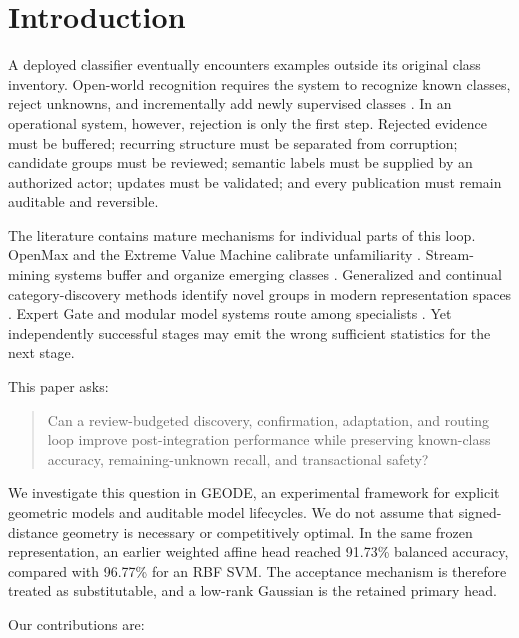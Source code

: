 \documentclass[10pt]{article}
\newcommand{\systemname}{GEODE}
\begin{document}
\section{Introduction}

A deployed classifier eventually encounters examples outside its original
class inventory. Open-world recognition requires the system to recognize known
classes, reject unknowns, and incrementally add newly supervised classes
\cite{bendale2015}. In an operational system, however, rejection is only the
first step. Rejected evidence must be buffered; recurring structure must be
separated from corruption; candidate groups must be reviewed; semantic labels
must be supplied by an authorized actor; updates must be validated; and every
publication must remain auditable and reversible.

The literature contains mature mechanisms for individual parts of this loop.
OpenMax and the Extreme Value Machine calibrate unfamiliarity
\cite{bendale2016,rudd2018}. Stream-mining systems buffer and organize emerging
classes \cite{masud2011,haque2016sand,haque2016echo,faria2016,mu2017}.
Generalized and continual category-discovery methods identify novel groups in
modern representation spaces \cite{vaze2022,cao2022,zhang2022,zhao2023}.
Expert Gate and modular model systems route among specialists
\cite{aljundi2017,gururangan2021,li2022}. Yet independently successful stages
may emit the wrong sufficient statistics for the next stage.

This paper asks:

\begin{quote}
Can a review-budgeted discovery, confirmation, adaptation, and routing loop
improve post-integration performance while preserving known-class accuracy,
remaining-unknown recall, and transactional safety?
\end{quote}

We investigate this question in \systemname, an experimental framework for
explicit geometric models and auditable model lifecycles. We do not assume that
signed-distance geometry is necessary or competitively optimal. In the same
frozen representation, an earlier weighted affine head reached 91.73\%
balanced accuracy, compared with 96.77\% for an RBF SVM. The acceptance
mechanism is therefore treated as substitutable, and a low-rank Gaussian is
the retained primary head.

Our contributions are:
\end{document}
